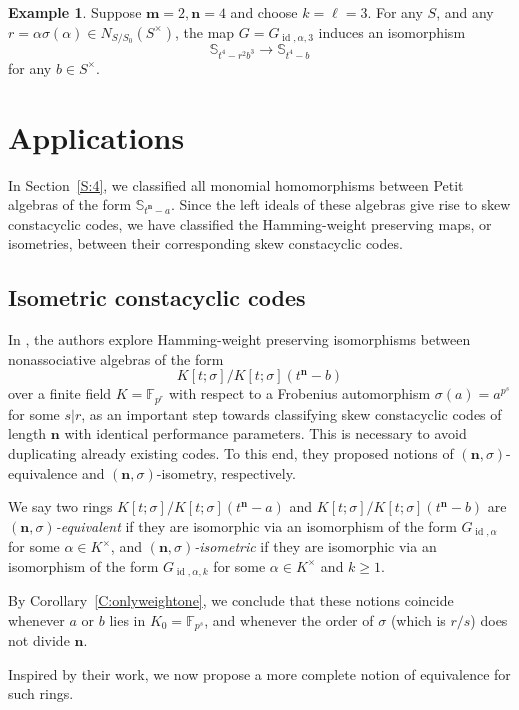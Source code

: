 \documentclass[11pt]{amsart}
\theoremstyle{plain}
\theoremstyle{definition}
\newtheorem{example}[theorem]{Example}
\numberwithin{equation}{section}
\numberwithin{figure}{section}
\newcommand{\Sone}[1]{\Stsigma/\Stsigma (t^{\de}-#1)} %
\newcommand{\ring}{S}
\newcommand{\field}{K}
\newcommand{\Stsigma}{S[t;\sigma]}
\newcommand{\Kone}[1]{K[t;\sigma]/K[t;\sigma](t^{\de}-#1)}
\DeclareMathOperator{\id}{id}
\newcommand{\os}{\mathbf{m}}  %
\newcommand{\de}{\mathbf{n}}  %
\newcommand{\F}{\mathbb{F}}
\begin{document}
\begin{example}\label{Examplewehave}
    Suppose $\os=2,\de=4$ and choose $k=\ell=3$. For any $\ring$, and any $r=\alpha \sigma(\alpha)\in N_{\ring/\ring_0}(\ring^\times)$, the map $G=G_{\id,\alpha,3}$ induces an isomorphism
    $$
  \mathbb{S}_{t^4 -r^2b^3}\to \mathbb{S}_{t^4 -b} 
    $$
    for any $b\in \ring^\times$.
\end{example}


\section{Applications}\label{S:applications}

In Section~\ref{S:4}, we classified all monomial homomorphisms between Petit algebras of the form $ \mathbb{S}_{t^\de -a}$. %
Since the left ideals of these algebras give rise to skew constacyclic codes, we have classified the Hamming-weight preserving maps, or isometries, between their corresponding skew constacyclic codes.

\subsection{Isometric constacyclic codes}\label{subsec:iso}

In \cite{OuazzouNajmeddineAydin2025}, the authors explore Hamming-weight preserving isomorphisms between nonassociative algebras of the form $$\Kone{b}$$ over a finite field $\field=\mathbb{F}_{p^r}$ with respect to a Frobenius automorphism $\sigma(a)=a^{p^s}$ for some $s|r$, as an important step towards classifying skew constacyclic codes of length $\de$ with identical performance parameters.  This is necessary to avoid duplicating already existing codes. To this end, they proposed notions of $(\de,\sigma)$-equivalence and $(\de,\sigma)$-isometry, respectively.


We say two rings $\Kone{a}$ and $\Kone{b}$ are \emph{$(\de,\sigma)$-equivalent} if they are isomorphic via an isomorphism of the form $G_{\id,\alpha}$ for some $\alpha\in \field^\times$, and
\emph{$(\de,\sigma)$-isometric} if they are isomorphic via an isomorphism of the form $G_{\id,\alpha,k}$ for some $\alpha\in \field^\times$ and $k\geq 1$.

By Corollary~\ref{C:onlyweightone}, we conclude that these notions coincide whenever $a$ or $b$ lies in $\field_0=\F_{p^s}$, and whenever the order of $\sigma$ (which is $r/s$) does not divide $\de$.


Inspired by their work, we now propose a more complete notion of equivalence for such rings.
\end{document}
